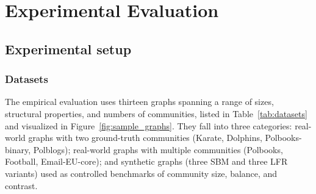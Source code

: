 
\section{Experimental Evaluation}
\label{sec:experiments}

\subsection{Experimental setup}
\label{sec:exp_setup}

\subsubsection{Datasets}
\label{sec:exp_datasets}

The empirical evaluation uses thirteen graphs spanning a range of
sizes, structural properties, and numbers of communities, listed
in Table~\ref{tab:datasets} and visualized in
Figure~\ref{fig:sample_graphs}. They fall into three categories:
real-world graphs with two ground-truth communities (Karate,
Dolphins, Polbooks-binary, Polblogs); real-world graphs with
multiple communities (Polbooks, Football, Email-EU-core); and
synthetic graphs (three SBM and three LFR variants) used as
controlled benchmarks of community size, balance, and contrast.

